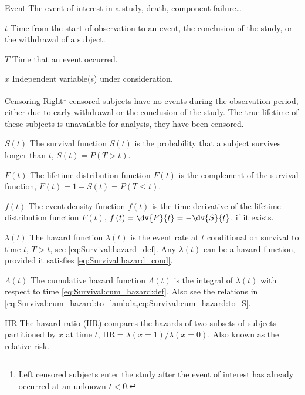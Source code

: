 \begin{symbollist}
  \item[Event] The event of interest in a study, \eg death, component failure\ldots
  \item[$t$] Time from the start of observation to an event, the conclusion of the study, or the withdrawal of a subject.
  \item[$T$] Time that an event occurred.
  \item[$x$] Independent variable(s) under consideration.
  \item[Censoring] Right\footnote{Left censored subjects enter the study after the event of interest has already occurred at an unknown $t < 0$.} censored subjects have no events during the observation period, either due to early withdrawal or the conclusion of the study. The true lifetime of these subjects is unavailable for analysis, \ie they have been censored.
  \item[$S\left(t\right)$] The survival function $S\left(t\right)$ is the probability that a subject survives longer than $t$, \ie $S\left(t\right) = P\left(T > t\right)$.
  \item[$F\left(t\right)$] The lifetime distribution function $F\left(t\right)$ is the complement of the survival function, \ie $F\left(t\right) = 1 - S\left(t\right) = P\left(T \leq t\right)$.
  \item[$f\left(t\right)$] The event density function $f\left(t\right)$ is the time derivative of the lifetime distribution function $F\left(t\right)$, $f\left(t\right) = \dv{F}{t} = -\dv{S}{t}$, if it exists.
  \item[$\lambda\left(t\right)$] The hazard function $\lambda\left(t\right)$ is the event rate at $t$ conditional on survival to time $t$, \ie $T > t$, see \cref{eq:Survival:hazard_def}. Any $\lambda\left(t\right)$ can be a hazard function, provided it satisfies \cref{eq:Survival:hazard_cond}.
  \item[$\Lambda\left(t\right)$] The cumulative hazard function $\Lambda\left(t\right)$ is the integral of $\lambda\left(t\right)$ with respect to time \cref{eq:Survival:cum_hazard:def}. Also see the relations in \cref{eq:Survival:cum_hazard:to_lambda,eq:Survival:cum_hazard:to_S}.
  \item[HR] The hazard ratio (HR) compares the hazards of two subsets of subjects partitioned by $x$ at time $t$, $\text{HR} = \lambda\left(x = 1\right) / \lambda\left(x=0\right)$. Also known as the relative risk.
\end{symbollist}

